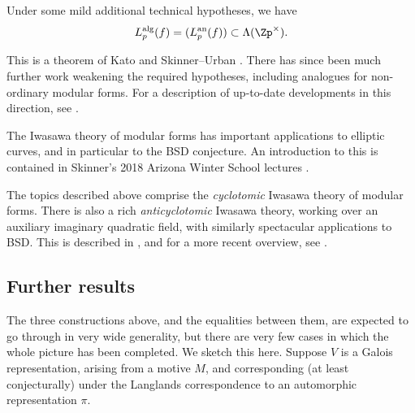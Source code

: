 \documentclass[a4paper,10pt, english, reqno]{smfart}
\numberwithin{equation}{section}
\begin{document}
\begin{theorem}
	Under some mild additional technical hypotheses, we have
	\[
	L_p^{\mathrm{alg}}(f) = (L_p^{\mathrm{an}}(f)) \subset \Lambda(\Zp^\times).
	\]
\end{theorem}
This is a theorem of Kato \cite{Kat04} and Skinner--Urban \cite{SU14}.
There has since been much further work weakening the required hypotheses, including analogues for non-ordinary modular forms. For a description of up-to-date developments in this direction, see \cite{FouquetWan}.



\begin{remark}
The Iwasawa theory of modular forms has important applications to elliptic curves, and in particular to the BSD conjecture. An introduction to this is contained in Skinner's 2018 Arizona Winter School lectures \cite{Ski18}. 
\end{remark}

\begin{remark}
The topics described above comprise the \emph{cyclotomic} Iwasawa theory of modular forms.  There is also a rich \emph{anticyclotomic} Iwasawa theory, working over an auxiliary imaginary quadratic field, with similarly spectacular applications to BSD. This is described in \cite{BD05}, and for a more recent overview, see \cite{CGLS22}.
\end{remark}








\subsection{Further results}\label{sec:appendix further generalisations}

The three constructions above, and the equalities between them, are expected to go through in very wide generality, but there are very few cases in which the whole picture has been completed. We sketch this here. Suppose $V$ is a Galois representation, arising from a motive $M$, and corresponding (at least conjecturally) under the Langlands correspondence to an automorphic representation $\pi$. 
\end{document}
